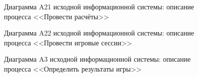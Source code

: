 \begin{figure}[h]
\caption{Диаграмма A21 исходной информационной системы: описание процесса <<Провести расчёты>>}
\label{ris:current_a21_diagram}
\end{figure}

\begin{landscape}
  \vspace*{\fill}
  \begin{figure}[h]
  \caption{Диаграмма A22 исходной информационной системы: описание процесса <<Провести игровые сессии>>}
  \label{ris:current_a22_diagram}
  \end{figure}
  \vspace*{\fill}  
\end{landscape}

\begin{figure}[h]
\caption{Диаграмма A3 исходной информационной системы: описание процесса <<Определить результаты игры>>}
\label{ris:current_a21_diagram}
\end{figure}

